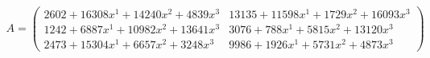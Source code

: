 \documentclass[preview]{standalone}
\begin{document}
\begin{align*}
A = \begin{pmatrix}2602 + 16308x^{1} + 14240x^{2} + 4839x^{3} & 13135 + 11598x^{1} + 1729x^{2} + 16093x^{3} \\ 1242 + 6887x^{1} + 10982x^{2} + 13641x^{3} & 3076 + 788x^{1} + 5815x^{2} + 13120x^{3} \\ 2473 + 15304x^{1} + 6657x^{2} + 3248x^{3} & 9986 + 1926x^{1} + 5731x^{2} + 4873x^{3}\end{pmatrix}
\end{align*}
\end{document}
